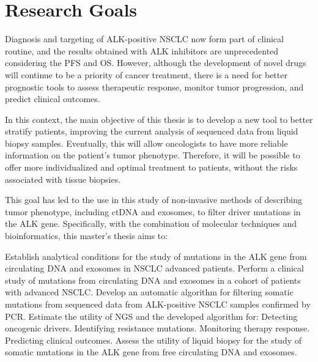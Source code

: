 \chapter{Research Goals}

Diagnosis and targeting of ALK-positive NSCLC now form part of clinical routine, and the results obtained with ALK inhibitors are unprecedented considering the PFS and OS. However, although the development of novel drugs will continue to be a priority of cancer treatment, there is a need for better prognostic tools to assess therapeutic response, monitor tumor progression, and predict clinical outcomes.

In this context, the main objective of this thesis is to develop a new tool to better stratify patients, improving the current analysis of sequenced data from liquid biopsy samples. Eventually, this will allow oncologists to have more reliable information on the patient's tumor phenotype. Therefore, it will be possible to offer more individualized and optimal treatment to patients, without the risks associated with tissue biopsies.

This goal has led to the use in this study of non-invasive methods of describing tumor phenotype, including ctDNA and exosomes, to filter driver mutations in the ALK gene. Specifically, with the combination of molecular techniques and bioinformatics, this master's thesis aims to:
\begin{outline}
    \1 Establish analytical conditions for the study of mutations in the ALK gene from circulating DNA and exosomes in NSCLC advanced patients.
    \1 Perform a clinical study of mutations from circulating DNA and exosomes in a cohort of patients with advanced NSCLC.
    \1 Develop an automatic algorithm for filtering somatic mutations from sequenced data from ALK-positive NSCLC samples confirmed by PCR.
    \1 Estimate the utility of NGS and the developed algorithm for:
        \2 Detecting oncogenic drivers.
        \2 Identifying resistance mutations.
        \2 Monitoring therapy response.
        \2 Predicting clinical outcomes.
    \1 Assess the utility of liquid biopsy for the study of somatic mutations in the ALK gene from free circulating DNA and exosomes.
\end{outline}
